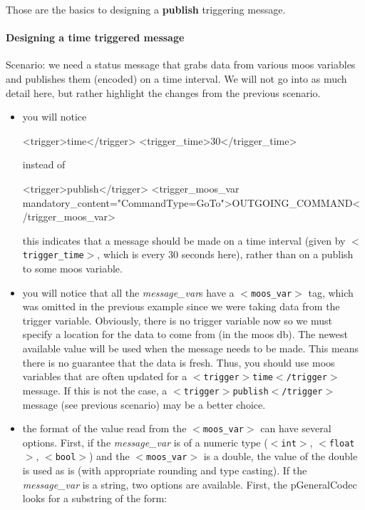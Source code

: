 \documentclass[11pt, letterpaper, oneside]{memoir}
\newcommand{\xmltag}[1]{\texttt{$<$#1$>$}}
\begin{document}
\begin{itemize}
Those are the basics to designing a \textbf{publish} triggering message.

\paragraph{Designing a time triggered message}
Scenario: we need a status message that grabs data from various moos variables and publishes them (encoded) on a time interval. We will not go into as much detail here, but rather highlight the changes from the previous scenario.
\begin{itemize}
\item you will notice
\begin{small}
\begin{boxedverbatim}
    <trigger>time</trigger>
    <trigger_time>30</trigger_time>
\end{boxedverbatim}
\resetbvlinenumber
\end{small}
instead of 
\begin{small}
\begin{boxedverbatim}
    <trigger>publish</trigger>
    <trigger_moos_var mandatory_content="CommandType=GoTo">OUTGOING_COMMAND</trigger_moos_var>
\end{boxedverbatim}
\resetbvlinenumber
\end{small}
this indicates that a message should be made on a time interval (given by \xmltag{trigger\_time}, which is every 30 seconds here), rather than on a publish to some moos variable.
\item you will notice that all the \textit{message\_var}s have a \xmltag{moos\_var} tag, which was omitted in the previous example since we were taking data from the trigger variable. Obviously, there is no trigger variable now so we must specify a location for the data to come from (in the moos db). The newest available value will be used when the message needs to be made. This means there is no guarantee that the data is fresh. Thus, you should use moos variables that are often updated for a \xmltag{trigger$>$time$<$/trigger} message. If this is not the case, a \xmltag{trigger$>$publish$<$/trigger} message (see previous scenario) may be a better choice.
\item the format of the value read from the \xmltag{moos\_var} can have several options. First, if the \textit{message\_var} is of a numeric type (\xmltag{int}, \xmltag{float}, \xmltag{bool}) and the \xmltag{moos\_var} is a double, the value of the double is used as is (with appropriate rounding and type casting). If the \textit{message\_var} is a string, two options are available. First, the pGeneralCodec looks for a substring of the form:

\end{itemize}
\end{itemize}
\end{document}
